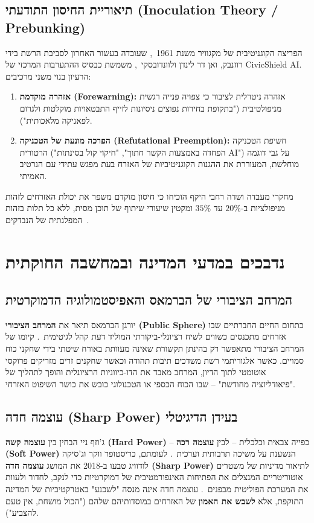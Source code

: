 \subsection{תיאוריית החיסון התודעתי (Inoculation Theory / Prebunking)}
הפריצה הקוגניטיבית של מקגוויר משנת 1961~\cite{mcguire1961resistance}, שעובדה בעשור האחרון לסביבת הרשת בידי רוזנבק, ואן דר לינדן ולוונדובסקי~\cite{roozenbeek2022inoculation}, משמשת כבסיס ההתערבות המרכזי של CivicShield AI. הרעיון בנוי משני מרכיבים:
\begin{enumerate}
    \item \textbf{אזהרה מוקדמת (Forewarning):} אזהרה ניטרלית לציבור כי צפויה פנייה רגשית מניפולטיבית ("בתקופת בחירות נפוצים ניסיונות לזייף התבטאויות מוקלטות ולגרום לפאניקה מלאכותית").
    \item \textbf{הפרכה מונעת של הטכניקה (Refutational Preemption):} חשיפת הטכניקה הרטורית ("הפחדה באמצעות הקשר חתוך", "חיקוי קול בסינתזת AI") על גבי דוגמה מוחלשת, המעוררת את ההגנות הקוגניטיביות של האזרח בעת מפגש עתידי עם הנרטיב האמיתי.
\end{enumerate}
מחקרי מעבדה ושדה רחבי היקף הוכיחו כי חיסון מוקדם משפר את יכולת האזרחים לזהות מניפולציות ב-$20\%$ עד $35\%$ ומקטין שיעורי שיתוף של תוכן מסית, ללא כל תלות בזהות המפלגתית של הנבדקים~\cite{roozenbeek2022inoculation}.

\section{נדבכים במדעי המדינה ובמחשבה החוקתית}

\subsection{המרחב הציבורי של הברמאס והאפיסטמולוגיה הדמוקרטית}
יורגן הברמאס תיאר את \textbf{המרחב הציבורי (Public Sphere)} כתחום החיים החברתיים שבו אזרחים מתכנסים כשווים לשיח רציונלי-ביקורתי המוליד דעת קהל לגיטימית~\cite{habermas1989public}. קיומו של המרחב הציבורי מתאפשר רק בהינתן תקשורת שאינה מעוותת באורח שיטתי בידי שחקני כוח סמויים. כאשר אלגוריתמי רשת משדכים תיבות תהודה וכאשר שחקנים זרים מזריקים פרוקסי אוטומטי לתוך הדיון, המרחב מאבד את הדו-כיווניות הרציונלית והופך לתהליך של "פיאודליזציה מחודשת" -- שבו הכוח הכספי או הטכנולוגי כובש את כושר השיפוט האזרחי.

\subsection{עוצמה חדה (Sharp Power) בעידן הדיגיטלי}
ג'וזף ניי הבחין בין \textbf{עוצמה קשה (Hard Power)} -- כפייה צבאית וכלכלית -- לבין \textbf{עוצמה רכה (Soft Power)} הנשענת על משיכה תרבותית וערכית~\cite{nye2004soft}. לעומתם, כריסטופר ווקר וג'סיקה לודוויג טבעו ב-2018 את המושג \textbf{עוצמה חדה (Sharp Power)} לתיאור מדיניות של משטרים אוטוריטריים המנצלים את הפתיחות האינפורמטיבית של דמוקרטיות כדי לנקב, לחדור ולעוות את המערכת הפוליטית מבפנים~\cite{walker2018sharp}. עוצמה חדה אינה מנסה "לשכנע" באטרקטיביות של המדינה התוקפת, אלא \textbf{לשבש את האמון} של האזרחים במוסדותיהם שלהם ("הכול מושחת, אין טעם להצביע").

